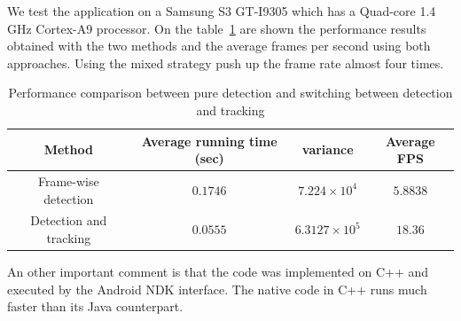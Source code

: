 We test the application on a Samsung S3 GT-I9305 which has a Quad-core 1.4 GHz
Cortex-A9 processor. On the table~\ref{tab:detectionvstracking} are shown the
performance results obtained with the two methods and the average frames per
second using both approaches. Using the mixed strategy push up the frame rate
almost four times.
 
\begin{table}
\begin{tabular}{|c|c|c|c|}
    \hline
    Method & Average running time (sec) & variance & Average FPS \\
    \hline
    Frame-wise detection & $0.1746$ & $7.224 \times 10^4$ & $5.8838$ \\
    \hline
    Detection and tracking  & $0.0555$ & $6.3127 \times 10^5$ & $18.36$ \\
    \hline
\end{tabular}
    \caption{Performance comparison between pure detection and switching between
    detection and tracking}
    \label{tab:detectionvstracking}
\end{table}

An other important comment is that the code was implemented on C++ and executed
by the Android NDK interface. The native code in C++ runs much faster than its
Java counterpart.



